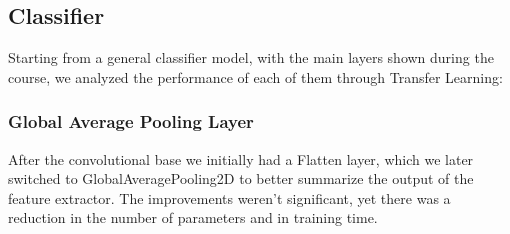 \documentclass[conference,compsoc,11pt]{IEEEtran}
\begin{document}




\subsection{Classifier}
Starting from a general classifier model, with the main layers shown during the course, we analyzed the performance of each of them through Transfer Learning:


\subsubsection{Global Average Pooling Layer} After the convolutional base we initially had a Flatten layer, which we later switched to GlobalAveragePooling2D to better summarize the output of the feature extractor. The improvements weren't significant, yet there was a reduction in the number of parameters and in training time.
\end{document}
